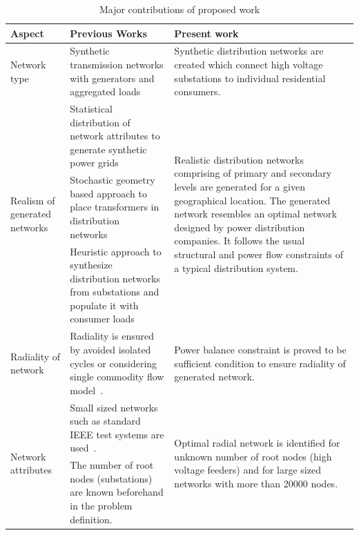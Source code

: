 \documentclass[sigconf]{acmart}
\begin{document}
\begin{table}[htb]
	\centering
	\caption{Major contributions of proposed work}
	\begin{tabular}{p{5em}p{22em}p{22em}}
		\toprule
		\textbf{Aspect} & \textbf{Previous Works} & \textbf{Present work} 
		\\\midrule
		Network type & Synthetic transmission networks with generators and aggregated loads~\cite{overbye_101,overbye_102,trpovski_2018,gm2016} & Synthetic distribution networks are created which connect high voltage substations to individual residential consumers.
		\\\midrule
		\multirow{3}{5em}{Realism of generated networks} 
		& \multicolumn{1}{p{22em}}{Statistical distribution of network attributes to generate synthetic power grids~\cite{schweitzer}}
		& \multirow{3}{22em}{Realistic distribution networks comprising of primary and secondary levels are generated for a given geographical location. The generated network resembles an optimal network designed by power distribution companies. It follows the usual structural and power flow constraints of a typical distribution system.}
		\\\cmidrule{2-2}
		& \multicolumn{1}{p{22em}}{Stochastic geometry based approach to place transformers in distribution networks~\cite{overbye_2019}}&\\\cmidrule{2-2}
		& \multicolumn{1}{p{22em}}{Heuristic approach to synthesize distribution networks from substations and populate it with consumer loads~\cite{trpovski_2018}}
		&
		\\\midrule
		Radiality of network 
		& Radiality is ensured by avoided isolated cycles or considering single commodity flow model~\cite{radiality_1987,radiality_2012,lei2019radiality,wang2019radial}. 
		& Power balance constraint is proved to be sufficient condition to ensure radiality of generated network. 
		\\\midrule
		\multirow{2}{5em}{Network attributes} 
		& \multicolumn{1}{p{22em}}{Small sized networks such as standard IEEE test systems are used~\cite{manish2019,manish2018OptimalDS}.}
		& \multirow{2}{22em}{Optimal radial network is identified for unknown number of root nodes (high voltage feeders) and for large sized networks with more than 20000 nodes.} \\\cmidrule{2-2}
		& \multicolumn{1}{p{22em}}{The number of root nodes (substations) are known beforehand in the problem definition.} 
		&  
		\\\bottomrule
	\end{tabular}
	\label{tab:contrib}
\end{table}
\end{document}
